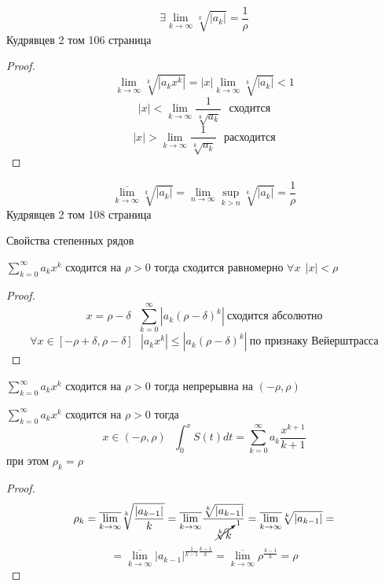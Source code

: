 \begin{theorem}
  $$
  \exists \lim_{k \to \infty} \sqrt[k]{|a_k|} = \frac{1}{\rho}
  $$
  Кудрявцев 2 том 106 страница
\end{theorem}

\begin{proof}
  $$
  \lim_{k \to \infty} \sqrt[k]{|a_k x^k|} = |x| \lim_{k \to \infty}
  \sqrt[k]{|a_k|} < 1
  $$
  $$
  |x| < \lim_{k \to \infty} \frac{1}{\sqrt[k]{a_k}} ~~~ \text{сходится}
  $$
  $$
  |x| > \lim_{k \to \infty} \frac{1}{\sqrt[k]{a_k}} ~~~ \text{расходится}
  $$
\end{proof}

\begin{block}
  $$
  \overline{\lim_{k \to \infty}} \sqrt[k]{|a_k|} =
  \lim_{n \to \infty} \sup_{k > n}\sqrt[k]{|a_k|} = \frac{1}{\rho}
  $$
  Кудрявцев 2 том 108 страница
\end{block}

\begin{title}[\Large]
  Свойства степенных рядов
\end{title}

\begin{theorem}
  $\sum_{k=0}^{\infty} a_k x^k$ сходится на $\rho > 0$ тогда сходится равномерно
  $\forall x ~~ |x| < \rho$
\end{theorem}

\begin{proof}
  $$
  x = \rho - \delta ~~~ \sum_{k=0}^{\infty} |a_k(\rho - \delta)^k| ~ \text{
  сходится абсолютно}
  $$
  $$
  \forall x \in [-\rho + \delta, \rho - \delta] ~~~
  |a_k x^k| \le |a_k(\rho - \delta)^k| ~ \text{по признаку Вейерштрасса}
  $$
\end{proof}

\begin{block}[Следствие 1]
  $\sum_{k=0}^{\infty} a_k x^k$ сходится на $\rho > 0$ тогда непрерывна на
  $(-\rho, \rho)$
\end{block}

\begin{block}[Следствие 2]
  $\sum_{k=0}^{\infty} a_k x^k$ сходится на $\rho > 0$ тогда
  $$
  x \in (-\rho, \rho) ~~~
  \int_0^x S(t)dt = \sum_{k=0}^{\infty} a_k \frac{x^{k+1}}{k+1}
  $$
  при этом $\rho_k = \rho$
\end{block}

\begin{proof}
  $$
  \rho_k = \overline{\lim_{k \to \infty}} \sqrt[k]{\frac{|a_{k-1}|}{k}} =
  \overline{\lim_{k \to \infty}} \frac{\sqrt[k]{|a_{k-1}|}}{
  \cancelto{1}{\sqrt[k]{k}}} =
  \overline{\lim_{k \to \infty}} \sqrt[k]{|a_{k-1}|} =
  $$
  $$
  = \overline{\lim_{k \to \infty}} |a_{k-1}|^{\frac{1}{k-1}\frac{k-1}{k}} =
  \overline{\lim_{k \to \infty}} \rho^{\frac{k-1}{k}} = \rho
  $$
\end{proof}

